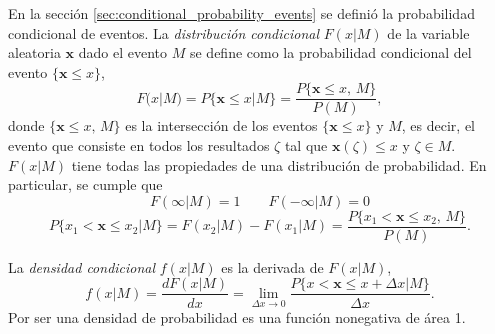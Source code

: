 \documentclass[a4paper]{report}
\newcommand{\x}{\mathbf{x}}
\begin{document}
En la sección \ref{sec:conditional_probability_events} se definió la probabilidad condicional de eventos. La \emph{distribución condicional} \(F(x|M)\) de la variable aleatoria \(\x\) dado el evento \(M\) se define como la probabilidad condicional del evento \(\{\x\leq x\}\),
\begin{equation}\label{eq:conditional_distribution_definition}
 F(x|M)=P\{\x\leq x|M\}=\frac{P\{\x\leq x,\,M\}}{P(M)},
\end{equation}
donde \(\{\x\leq x,\,M\}\) es la intersección de los eventos \(\{\x\leq x\}\) y \(M\), es decir, el evento que consiste en todos los resultados \(\zeta\) tal que \(\x(\zeta)\leq x\) y \(\zeta\in M\). \(F(x|M)\) tiene todas las propiedades de una distribución de probabilidad. En particular, se cumple que
\[
 F(\infty|M)=1\qquad F(-\infty|M)=0
\]
\[
 P\{x_1<\x\leq x_2|M\}=F(x_2|M)-F(x_1|M)=\frac{P\{x_1<\x\leq x_2,\,M\}}{P(M)}.
\]

La \emph{densidad condicional} \(f(x|M)\) es la derivada de \(F(x|M)\),
\[
 f(x|M)=\frac{dF(x|M)}{dx}=\lim_{\Delta x\to 0}\frac{P\{x<\x\leq x+\Delta x|M\}}{\Delta x}.
\]
Por ser una densidad de probabilidad es una función nonegativa de área 1.
\end{document}
